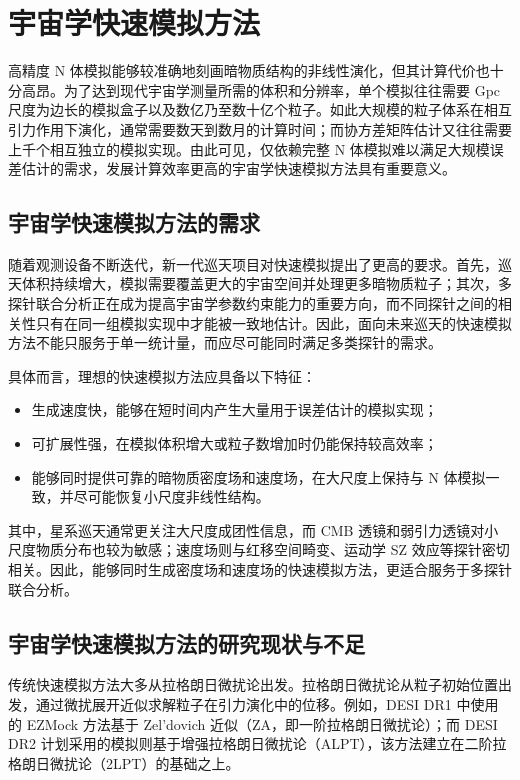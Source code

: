 \section{宇宙学快速模拟方法}

高精度 N 体模拟能够较准确地刻画暗物质结构的非线性演化，但其计算代价也十分高昂。为了达到现代宇宙学测量所需的体积和分辨率，单个模拟往往需要 Gpc 尺度为边长的模拟盒子以及数亿乃至数十亿个粒子。如此大规模的粒子体系在相互引力作用下演化，通常需要数天到数月的计算时间；而协方差矩阵估计又往往需要上千个相互独立的模拟实现。由此可见，仅依赖完整 N 体模拟难以满足大规模误差估计的需求，发展计算效率更高的宇宙学快速模拟方法具有重要意义。

\subsection{宇宙学快速模拟方法的需求}

随着观测设备不断迭代，新一代巡天项目对快速模拟提出了更高的要求。首先，巡天体积持续增大，模拟需要覆盖更大的宇宙空间并处理更多暗物质粒子；其次，多探针联合分析正在成为提高宇宙学参数约束能力的重要方向，而不同探针之间的相关性只有在同一组模拟实现中才能被一致地估计。因此，面向未来巡天的快速模拟方法不能只服务于单一统计量，而应尽可能同时满足多类探针的需求。

具体而言，理想的快速模拟方法应具备以下特征：
\begin{itemize}
  \item 生成速度快，能够在短时间内产生大量用于误差估计的模拟实现；
  \item 可扩展性强，在模拟体积增大或粒子数增加时仍能保持较高效率；
  \item 能够同时提供可靠的暗物质密度场和速度场，在大尺度上保持与 N 体模拟一致，并尽可能恢复小尺度非线性结构。
\end{itemize}

其中，星系巡天通常更关注大尺度成团性信息，而 CMB 透镜和弱引力透镜对小尺度物质分布也较为敏感；速度场则与红移空间畸变、运动学 SZ 效应等探针密切相关。因此，能够同时生成密度场和速度场的快速模拟方法，更适合服务于多探针联合分析。

\subsection{宇宙学快速模拟方法的研究现状与不足}

传统快速模拟方法大多从拉格朗日微扰论出发。拉格朗日微扰论从粒子初始位置出发，通过微扰展开近似求解粒子在引力演化中的位移。例如，DESI DR1 中使用的 EZMock 方法基于 Zel'dovich 近似（ZA，即一阶拉格朗日微扰论）；而 DESI DR2 计划采用的模拟则基于增强拉格朗日微扰论（ALPT），该方法建立在二阶拉格朗日微扰论（2LPT）的基础之上\citep{kitaura2013alpt,kitaura2014patchy,chuang2015ezmocks}。

